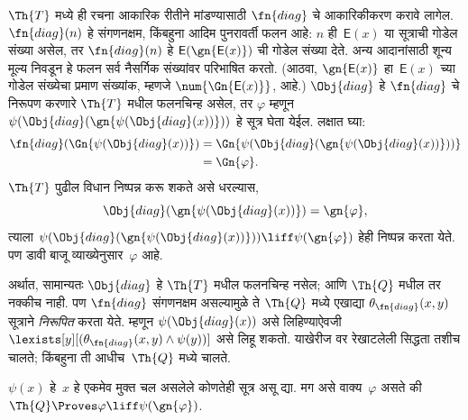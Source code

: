 \begin{explain}
$\Th{T}$ मध्ये ही रचना आकारिक रीतीने मांडण्यासाठी
$\fn{diag}$ चे आकारिकीकरण करावे लागेल.
$\fn{diag}(n)$ हे संगणनक्षम, किंबहुना आदिम पुनरावर्ती
फलन आहे: $n$ ही~$\mathsf{E}(x)$ या सूत्राची गोडेल
संख्या असेल, तर $\fn{diag}(n)$ हे
$\mathsf{E}(\gn{\mathsf{E}(x)})$ ची गोडेल संख्या देते. अन्य आदानांसाठी शून्य मूल्य निवडून
हे फलन सर्व नैसर्गिक संख्यांवर परिभाषित करतो.
(आठवा, $\gn{\mathsf{E}(x)}$ हा~$\mathsf{E}(x)$ च्या गोडेल
संख्येचा प्रमाण संख्यांक, म्हणजे
$\num{\Gn{\mathsf{E}(x)}}$, आहे.) $\Obj{diag}$ हे
$\fn{diag}$ चे निरूपण करणारे $\Th{T}$ मधील
फलनचिन्ह असेल, तर $\varphi$ म्हणून
$\psi(\Obj{diag}(\gn{\psi(\Obj{diag}(x))}))$
हे सूत्र घेता येईल. लक्षात घ्या:
\begin{align*}
\fn{diag}(\Gn{\psi(\Obj{diag}(x))}) & =
\Gn{\psi(\Obj{diag}(\gn{\psi(\Obj{diag}(x))}))} \\
& = \Gn{\varphi}.
\end{align*}
$\Th{T}$ पुढील विधान निष्पन्न करू शकते असे धरल्यास,
\[\Obj{diag}(\gn{\psi(\Obj{diag}(x))}) = \gn{\varphi},
\]
त्याला $\psi(\Obj{diag}(\gn{\psi(\Obj{diag}(x))}))
\liff \psi(\gn{\varphi})$ हेही निष्पन्न करता येते.
पण डावी बाजू व्याख्येनुसार~$\varphi$ आहे.

अर्थात, सामान्यतः $\Obj{diag}$ हे
$\Th{T}$ मधील फलनचिन्ह नसेल; आणि
$\Th{Q}$ मधील तर नक्कीच नाही. पण
$\fn{diag}$ संगणनक्षम असल्यामुळे ते
$\Th{Q}$ मध्ये एखाद्या
$\theta_{\fn{diag}}(x,y)$ सूत्राने
\emph{निरूपित} करता येते. म्हणून
$\psi(\Obj{diag}(x))$ असे लिहिण्याऐवजी
$\lexists[y][(\theta_{\fn{diag}}(x,y) \land \psi(y))]$
असे लिहू शकतो. याखेरीज वर रेखाटलेली सिद्धता तशीच
चालते; किंबहुना ती आधीच~$\Th{Q}$ मध्ये चालते.
\end{explain}

\begin{lem}
\label{inc:inp:fix:lem:fixed-point} $\psi(x)$ हे~$x$ हे एकमेव मुक्त चल
असलेले कोणतेही सूत्र असू द्या. मग असे वाक्य~$\varphi$
असते की $\Th{Q} \Proves
\varphi \liff \psi(\gn{\varphi})$.
\end{lem}


